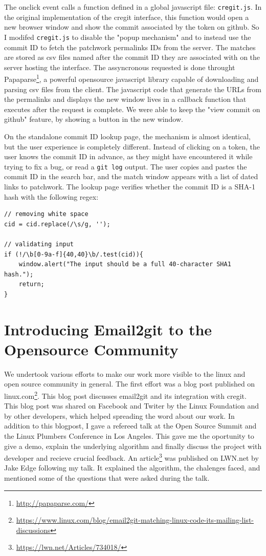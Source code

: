 The onclick event calls a function defined in a global javascript file: \texttt{cregit.js}. In the original implementation of the cregit interface, this function would open a new browser window and show the commit associated by the token on github. So I modifed \texttt{cregit.js} to disable the "popup mechanism" and to instead use the commit ID to fetch the patchwork permalinks IDs from the server. The matches are stored as csv files named after the commit ID they are associated with on the server hosting the interface. The assyncronous requested is done throught Papaparse\footnote{\url{http://papaparse.com/}}, a powerful opensource javascript library capable of downloading and parsing csv files from the client. The javascript code that generate the URLs from the permalinks and displays the new window lives in a callback function that executes after the request is complete. We were able to keep the "view commit on github" feature, by showing a button in the new window.  

On the standalone commit ID lookup page, the mechanism is almost identical, but the user experience is completely different. Instead of clicking on a token, the user knows the commit ID in advance, as they might have encountered it while trying to fix a bug, or read a \texttt{git log} output. The user copies and pastes the commit ID in the search bar, and the match window appears with a list of dated links to patchwork. The lookup page verifies whether the commit ID is a SHA-1 hash with the following regex:

\begin{lstlisting}
// removing white space
cid = cid.replace(/\s/g, '');

// validating input
if (!/\b[0-9a-f]{40,40}\b/.test(cid)){
    window.alert("The input should be a full 40-character SHA1 hash.");
    return;
}
\end{lstlisting}



\section{Introducing Email2git to the Opensource Community}

We undertook various efforts to make our work more visible to the linux and open source community in general. The first effort was a blog post published on linux.com\footnote{\url{https://www.linux.com/blog/email2git-matching-linux-code-its-mailing-list-discussions}}. This blog post discusses email2git and its integration with cregit. This blog post was shared on Facebook and Twiter by the Linux Foundation and by other developers, which helped spreading the word about our work. In addition to this blogpost, I gave a refereed talk at the Open Source Summit and the Linux Plumbers Conference in Los Angeles. This gave me the oportunity to give a demo, explain the underlying algorithm and finally discuss the project with developer and recieve crucial feedback. An article\footnote{\url{https://lwn.net/Articles/734018/}} was published on LWN.net by Jake Edge following my talk. It explained the algorithm, the chalenges faced, and mentioned some of the questions that were asked during the talk.


